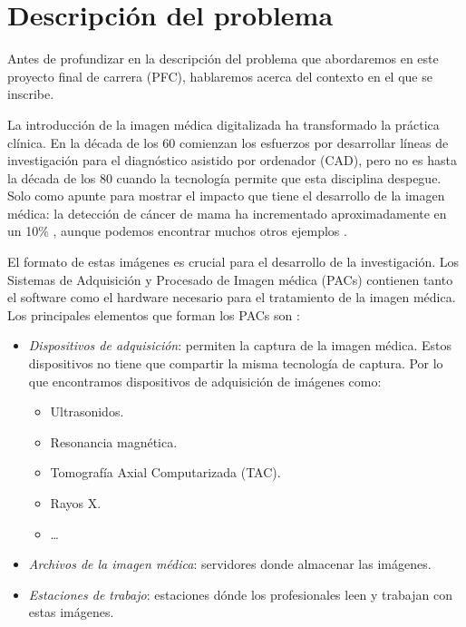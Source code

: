 \section{Descripción del problema}\label{intro}
Antes de profundizar en la descripción del problema que abordaremos en este proyecto final de carrera (PFC), hablaremos acerca del contexto en el que se inscribe.\medskip\par

La introducción de la imagen médica digitalizada ha transformado la práctica clínica. 
En la década de los 60 \cite{journals/cmig/Doi07} comienzan los esfuerzos por desarrollar líneas de investigación para el diagnóstico asistido por ordenador (CAD), pero no es hasta la década de los 80 cuando la tecnología permite que esta disciplina despegue. Solo como apunte para mostrar el impacto que tiene  el desarrollo de la imagen médica: la detección de cáncer de mama ha incrementado aproximadamente en un 10\% \cite{journals/cmig/Nishikawa07}, aunque podemos encontrar muchos otros ejemplos \cite{johnston1994effects, doi:10.1117/12.877968, kundel1975interpreting, Fujita:2008:CDE:1456710.1456735}.\medskip\par

El formato de estas imágenes es crucial para el desarrollo de la investigación. Los Sistemas de Adquisición y Procesado de Imagen médica (PACs) \cite{huang2010pacs} contienen tanto el software como el hardware necesario para el tratamiento de la imagen médica.  Los principales elementos que forman los PACs son \cite{pianykh2012digital}:
\begin{itemize}
	\item \textit{Dispositivos de adquisición}: permiten la captura de la imagen médica. Estos dispositivos no tiene que compartir la misma tecnología de captura. Por lo que encontramos dispositivos de adquisición de imágenes como:
	\begin{itemize}
		\item Ultrasonidos.
		\item Resonancia magnética.
		\item Tomografía Axial Computarizada (TAC).
		\item Rayos X.
		\item \ldots
	\end{itemize}
	\item \textit{Archivos de la imagen médica}: servidores donde almacenar las imágenes.
	\item \textit{Estaciones de trabajo}: estaciones dónde los profesionales leen y trabajan con estas imágenes. 
\end{itemize}

